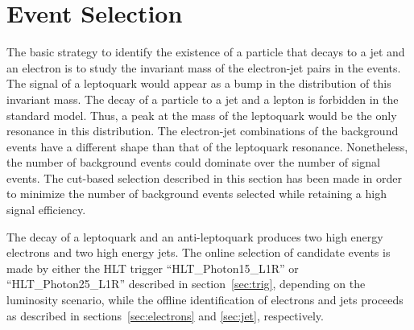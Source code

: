 %

\section{Event Selection} \label{sec:eventSelection}


The basic strategy to identify the existence of a particle that decays to a jet and an electron 
is to study the invariant mass of the electron-jet pairs in the events. 
The signal of a leptoquark would appear as a bump in the distribution of this invariant mass.
The decay of a particle to a jet and a lepton is forbidden in the standard model.  
Thus, a peak at the mass of the leptoquark would be the only resonance in this distribution. 
The electron-jet combinations of the background events have a different shape than that 
of the leptoquark resonance. 
Nonetheless, the number of background events could dominate over the number of signal events.  
The cut-based selection described in this section has been made in order to minimize the number 
of background events selected while retaining a high signal efficiency.

The decay of a leptoquark and an anti-leptoquark produces two high energy electrons and 
two high energy jets.
The online selection of candidate events is made by either the HLT trigger ``HLT\_Photon15\_L1R'' 
or ``HLT\_Photon25\_L1R'' described in section~\ref{sec:trig}, depending on the luminosity scenario, 
while the offline identification of electrons and jets 
proceeds as described in sections~\ref{sec:electrons} and \ref{sec:jet}, respectively.

